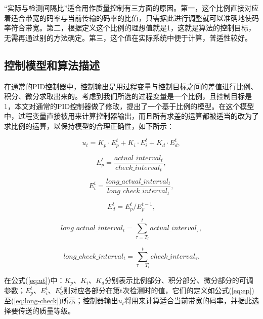 “实际与检测间隔比”适合用作质量控制有三方面的原因。第一，这个比例直接对应着适合带宽的码率与当前传输的码率的比值，只需据此进行调整就可以准确地使码率符合带宽。第二，根据定义这个比例的理想值就是1，这就是算法的控制目标，无需再通过别的方法确定。第三，这个值在实际系统中便于计算，普适性较好。

\subsection{控制模型和算法描述}

在通常的PID控制器中，控制输出是用过程变量与控制目标之间的差值进行比例、积分、微分求取出来的。考虑到我们所选的过程变量是一个比例，且控制目标是1，本文对通常的PID控制器做了修改，提出了一个基于比例的模型。在这个模型中，过程变量直接被用来计算控制器输出，而且所有求差的运算都被适当的改为了求比例的运算，以保持模型的合理正确性，如下所示：

\begin{equation}
\label{eq:ut}
{u_t} = {K_p} \cdot E_p^t + {K_i} \cdot E_i^t + {K_d} \cdot E_d^t ,
\end{equation}

\begin{equation}
\label{eq:ep}
E_p^t = \frac{{actual\_interva{l_t}}}{{check\_interva{l_t}}} ,
\end{equation}

\begin{equation}
\label{eq:ei}
E_i^t = \frac{{long\_actual\_interva{l_t}}}{{long\_check\_interva{l_t}}} ,
\end{equation}

\begin{equation}
\label{eq:ed}
E_d^t = E_p^t/E_p^{t - 1} ,
\end{equation}

\begin{equation}
\label{eq:long-actual}
long\_actual\_interva{l_t} = \sum\limits_{\tau = {T_l}}^t {actual\_interva{l_\tau}} ,
\end{equation}

\begin{equation}
\label{eq:long-check}
long\_check\_interva{l_t} = \sum\limits_{\tau = {T_l}}^t {check\_interva{l_\tau}} .
\end{equation}

在公式(\ref{eq:ut})中：$K_p$、$K_i$、$K_d$分别表示比例部分、积分部分、微分部分的可调参数；$E_p^t$、$E_i^t$、$E_d^t$则对应各部分在第t次检测时的值，它们的定义如公式(\ref{eq:ep})至(\ref{eq:long-check})所示；控制器输出$u_t$将用来计算适合当前带宽的码率，并据此选择要传送的质量等级。

